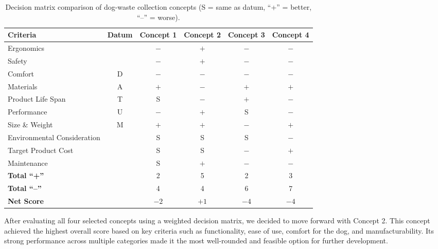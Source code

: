 \documentclass[12pt]{article}
\theoremstyle{definition} %
\theoremstyle{plain} %
\begin{document}
\begin{table}[h]
  \centering
  \small                       %
  \setlength\tabcolsep{4pt}    %
  \begin{tabular*}{\textwidth}{@{\extracolsep{\fill}} lccccc}
      \toprule
      \textbf{Criteria} & \textbf{Datum} &
      \textbf{Concept 1} & \textbf{Concept 2} &
      \textbf{Concept 3} & \textbf{Concept 4}\\
      \midrule
      Ergonomics                  &        & $-$ & $+$ & $-$ & $-$\\
      Safety                      &        & $-$ & $+$ & $-$ & $-$\\
      Comfort                     & D      & $-$ & $-$ & $-$ & $-$\\
      Materials                   & A      & $+$ & $-$ & $+$ & $+$\\
      Product Life Span           & T      & S   & $-$ & $+$ & $-$\\
      Performance                 & U      & $-$ & $+$ & S   & $-$\\
      Size \& Weight              & M      & $+$ & $+$ & $-$ & $+$\\
      Environmental Consideration &        & S   & S   & S   & $-$\\
      Target Product Cost         &        & S   & S   & $-$ & $+$\\
      Maintenance                 &        & S   & $+$ & $-$ & $-$\\
      \midrule
      \textbf{Total “+”}          &        & 2   & 5   & 2   & 3\\
      \textbf{Total “–”}          &        & 4   & 4   & 6   & 7\\
      \textbf{Net Score}          &        & $-2$& $+1$& $-4$& $-4$\\
      \bottomrule
  \end{tabular*}
  \caption{Decision matrix comparison of dog-waste collection concepts
           (S = same as datum, “+” = better, “–” = worse).}
\end{table}

After evaluating all four selected concepts using a weighted decision matrix, we
decided to move forward with Concept 2. This concept achieved the highest overall
score based on key criteria such as functionality, ease of use, comfort for the dog,
and manufacturability. Its strong performance across multiple categories made it the
most well-rounded and feasible option for further development.
\end{document}
